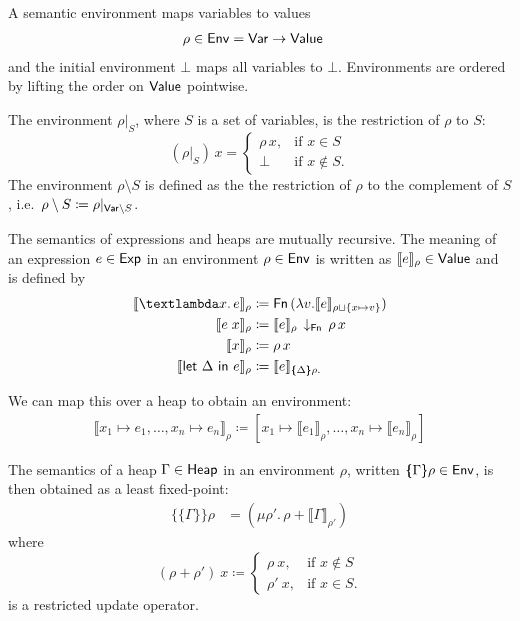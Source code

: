 \documentclass{jfp1}
\theoremstyle{nonumberbreak}
\newcommand{\sVar}   {\text{\textsf{Var}}}
\newcommand{\sExp}   {\text{\textsf{Exp}}}
\newcommand{\sHeap}  {\text{\textsf{Heap}}}
\newcommand{\sValue} {\text{\textsf{Value}}}
\newcommand{\sEnv}   {\text{\textsf{Env}}}
\newcommand{\sFn}[1]{\text{\textsf{Fn}}\,(#1)}
\newcommand{\sFnProj}[2]{#1\,\downarrow_{\text{\textsf{Fn}}}\,#2}
\newcommand{\keyword}[1]{\text{\textsf{#1}}}
\newcommand{\sApp}[2]{#1\;#2}
\newcommand{\sLam}[2]{\text{\textlambda} #1.\, #2}
\newcommand{\sLet}[2]{\keyword{let}~#1~\keyword{in}~#2}
\newcommand{\dom}[1]{\text{dom}\;#1}
\newcommand{\xen}{x_1\mapsto e_1, \ldots, x_n\mapsto e_n}
\newcommand{\dsem}[2]{\llbracket #1 \rrbracket_{#2}}
\newcommand{\esem}[1]{\{\!\!\!\{#1\}\!\!\!\}}
\newcommand{\upd}[1]{\mathop{++_{#1}}}
\begin{document}
A semantic environment maps variables to values
\begin{alignat*}{2}
\rho \in \sEnv &= \sVar \to \sValue
\end{alignat*}
and the initial environment $\bot$ maps all variables to $\bot$. Environments are ordered by lifting the order on $\sValue$ pointwise.

The environment $\rho|_S$, where $S$ is a set of variables, is the restriction of $\rho$ to $S$:
\[
(\rho |_S)\, x = 
\begin{cases}
\rho\, x,& \text{if } x \in S\\
\bot& \text{if } x \not\in S.
\end{cases}
\]
The environment $\rho\setminus S$ is defined as the the restriction of $\rho$ to the complement of $S$, i.e.\ \mbox{$\rho\setminus S \coloneqq \rho|_{\sVar \setminus S}$}.

The semantics of expressions and heaps are mutually recursive. The meaning of an expression $e \in \sExp$ in an environment $\rho \in \sEnv$ is written as $\dsem e \rho \in \sValue$ and is defined by
\begin{align*}
\dsem{\sLam x e}\rho &\coloneqq \sFn{\lambda v. \dsem e {\rho \sqcup \{x \mapsto v\}}}\\
\dsem{\sApp e  x}\rho &\coloneqq \sFnProj {\dsem e \rho}{\rho\,x}\\
\dsem{x}\rho &\coloneqq \rho\,x\\
\dsem{\sLet{\Delta}e}\rho &\coloneqq \dsem e {\esem{\Delta}\rho.}
\end{align*}

We can map this over a heap to obtain an environment:
\begin{align*}
\dsem{\xen}\rho \coloneqq [x_1 \mapsto \dsem{e_1}{\rho}, \ldots, x_n \mapsto \dsem{e_n}{\rho}]
\end{align*}

The semantics of a heap $\Gamma \in \sHeap$ in an environment $\rho$, written $\esem \Gamma \rho \in \sEnv$, is then obtained as a least  fixed-point:
\begin{align*}
\esem{\Gamma}\rho &= (\mu \rho'.\, \rho \upd{\dom \Gamma} \dsem{\Gamma}{\rho'})
\end{align*}
where
\[
(\rho \upd{S} \rho')~x \coloneqq
\begin{cases}
\rho~x, &\text{if } x \notin S \\
\rho'~x, &\text{if } x \in S.
\end{cases}
\]
is a restricted update operator.
\end{document}
